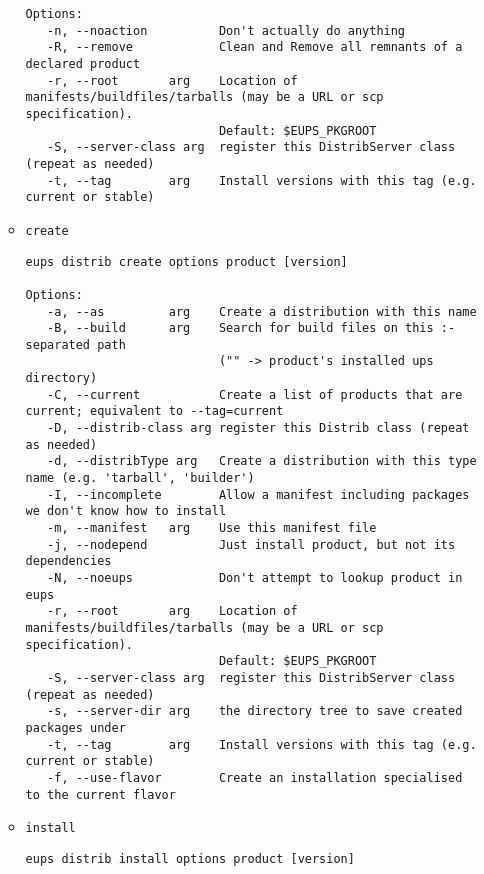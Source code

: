 \documentclass{article}
\newcommand{\code}[1]{\texttt{#1}}
\begin{document}
\begin{itemize}
\begin{itemize}
\begin{verbatim}
Options:
   -n, --noaction          Don't actually do anything
   -R, --remove            Clean and Remove all remnants of a declared product
   -r, --root       arg    Location of manifests/buildfiles/tarballs (may be a URL or scp specification).
                           Default: $EUPS_PKGROOT
   -S, --server-class arg  register this DistribServer class (repeat as needed)
   -t, --tag        arg    Install versions with this tag (e.g. current or stable)
\end{verbatim}

\item\code{create}
\begin{verbatim}
eups distrib create options product [version]

Options:
   -a, --as         arg    Create a distribution with this name
   -B, --build      arg    Search for build files on this :-separated path
                           ("" -> product's installed ups directory)
   -C, --current           Create a list of products that are current; equivalent to --tag=current
   -D, --distrib-class arg register this Distrib class (repeat as needed)
   -d, --distribType arg   Create a distribution with this type name (e.g. 'tarball', 'builder')
   -I, --incomplete        Allow a manifest including packages we don't know how to install
   -m, --manifest   arg    Use this manifest file
   -j, --nodepend          Just install product, but not its dependencies
   -N, --noeups            Don't attempt to lookup product in eups
   -r, --root       arg    Location of manifests/buildfiles/tarballs (may be a URL or scp specification).
                           Default: $EUPS_PKGROOT
   -S, --server-class arg  register this DistribServer class (repeat as needed)
   -s, --server-dir arg    the directory tree to save created packages under
   -t, --tag        arg    Install versions with this tag (e.g. current or stable)
   -f, --use-flavor        Create an installation specialised to the current flavor
\end{verbatim}

\item\code{install}
\begin{verbatim}
eups distrib install options product [version]


\end{verbatim}
\end{itemize}
\end{itemize}
\end{document}
